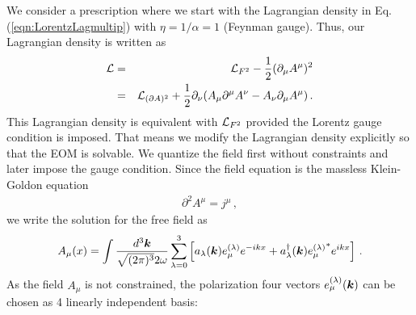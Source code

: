 We consider a  prescription where we start with the Lagrangian density in Eq. (\ref{eqn:LorentzLagmultip})
with $\eta = 1/ \alpha = 1$ (Feynman gauge). Thus, our Lagrangian density is written as
\begin{eqnarray}
{\cal L}
&=&
{\cal L}_{F^2} - \frac{1}{2}(\partial_\mu A^\mu)^2
\nonumber\\
&=&
{\cal L}_{(\partial A)^2} 
+ \frac{1}{2}
\partial_\nu (
A_\mu \partial^\mu A^\nu
-
A_\nu \partial_\mu A^\mu
) \,.
\label{eqn:LorQFermiLag}
\end{eqnarray}
This Lagrangian density is equivalent with ${\cal L}_{F^2}$ provided
the Lorentz gauge condition is imposed. That means we modify the 
Lagrangian density explicitly so that the EOM is solvable.
We quantize the field first without constraints and later impose
the gauge condition.
Since the field equation is the massless Klein-Goldon equation
\begin{eqnarray}
\partial^2 A^\mu = j^\mu
\,,
\end{eqnarray}
we write the solution for the free field as
\begin{eqnarray}
A_\mu (x)
=
\int
\frac{d^3 \mbox{\boldmath $k$}}
{\sqrt{(2\pi)^3} 2\omega}
\sum_{\lambda = 0}^3
\left[
a_\lambda (\mbox{\boldmath $k$})
e_\mu^{(\lambda)} e^{-ikx}
+
a^\dagger_\lambda (\mbox{\boldmath $k$})
{e_\mu^{(\lambda)}}^* e^{ikx}
\right] \,.
\label{eqn:photonFieldExpansionLorentz}
\end{eqnarray}
As the field $A_\mu$ is not constrained, the polarization four vectors $e_\mu^{(\lambda)}(\mbox{\boldmath $k$})$ 
can be chosen as 4 linearly independent basis:
\begin{comment}
\begin{eqnarray}
\begin{array}{l}
\sum_{\mu = 0}^3 e_\mu^{(\lambda)} e_\mu^{(\lambda')} 
=
\delta^{\lambda \lambda'}
\vspace{2mm}
\\
\sum_{\lambda=0}^3
e_\mu^{(\lambda)} e_\nu^{(\lambda)} 
=
\delta_{\mu \nu}
\hspace{5mm}
\mbox{completeness}
\vspace{2mm}
\\
e_\mu^{(\lambda)} e^{(\lambda')\mu}
= g^{\lambda \lambda'} 
\hspace{5mm}
\mbox{orthonormality}
\end{array}
\end{eqnarray}
\begin{eqnarray}
\sum_{\lambda=0}^3
\frac{ e_\mu^{(\lambda)} {e_\nu^{(\lambda)}}^* }
{e^{(\lambda)} \cdot {e^{(\lambda)}}^* }
= g_{\mu \nu}
\,,
\hspace{5mm}
e^{(\lambda)} \cdot {e^{(\lambda')}}^* 
=
g^{\lambda \lambda'}
\end{eqnarray}
\end{comment}
